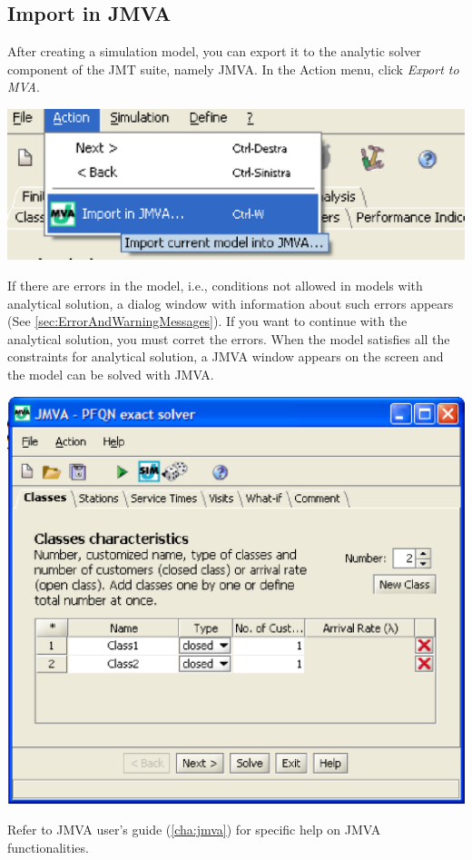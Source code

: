 \begin{description*}
\section{Import in JMVA}
\label{sec:importInJMVA}
After creating a simulation model, you can export it to the analytic solver component of the JMT suite, namely JMVA. In the Action menu, click \emph{Export to MVA}.
\begin{center}
\includegraphics[scale=.5]{img/jsim/import_to_JMVA.eps}
\end{center}
If there are errors in the model, i.e., conditions not allowed in models with analytical solution, a dialog window with information about such errors appears (See \autoref{sec:ErrorAndWarningMessages}). If you want to continue with the analytical solution, you must corret the errors.
When the model satisfies all the constraints for analytical solution, a JMVA window appears on the screen and the model can be solved with JMVA.
\begin{center}
\includegraphics[scale=.5]{img/jsim/jmva.eps}
\end{center}
Refer to JMVA user's guide (\autoref{cha:jmva}) for specific help on JMVA functionalities.


\end{description*}

